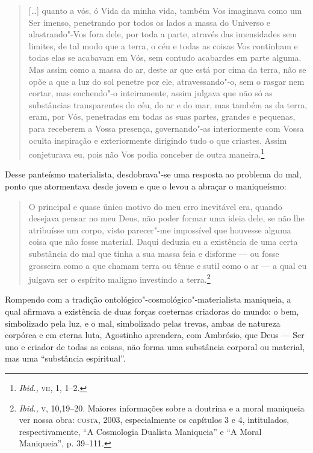 \begin{quote}
[\ldots{}] quanto a vós, ó Vida da minha vida, também Vos imaginava
como um Ser imenso, penetrando por todos os lados a massa do
Universo e alastrando"-Vos fora dele, por toda a parte, através
das imensidades sem limites, de tal modo que a terra, o céu e
todas as coisas Vos continham e todas elas se acabavam em Vós,
sem contudo acabardes em parte alguma. Mas assim como a massa do
ar, deste ar que está por cima da terra, não se opõe a que a luz
do sol penetre por ele, atravessando"-o, sem o rasgar nem cortar,
mas enchendo"-o inteiramente, assim julgava que não só as
substâncias transparentes do céu, do ar e do mar, mas também as
da terra, eram, por Vós, penetradas em todas as suas partes,
grandes e pequenas, para receberem a Vossa presença,
governando"-as interiormente com Vossa oculta inspiração e
exteriormente dirigindo tudo o que criastes. Assim conjeturava
eu, pois não Vos podia conceber de outra maneira.\footnote{
\emph{Ibid.,} \textsc{vii}, 1, 1--2.} 
\end{quote}

Desse panteísmo materialista, desdobrava"-se uma resposta ao
problema do mal, ponto que atormentava desde jovem e que o levou
a abraçar o maniqueísmo: 

\begin{quote}
O principal e quase único motivo do meu erro inevitável era,
quando desejava pensar no meu Deus, não poder formar uma ideia
dele, se não lhe atribuísse um corpo, visto parecer"-me
impossível que houvesse alguma coisa que não fosse material.
Daqui deduzia eu a existência de uma certa substância do mal que
tinha a sua massa feia e disforme --- ou fosse grosseira como a
que chamam terra ou tênue e sutil como o ar --- a qual eu julgava
ser o espírito maligno investindo a terra.\footnote{
\emph{Ibid.,} \textsc{v}, 10,19--20. Maiores informações sobre a
doutrina e a moral maniqueia ver nossa obra: \textsc{costa}, 2003,
especialmente os capítulos  3 e 4, intitulados, respectivamente,
“A Cosmologia Dualista Maniqueia” e “A Moral Maniqueia”, p.
39--111.}
\end{quote}

Rompendo com a tradição ontológico"-cosmológico"-materialista
maniqueia, a qual afirmava a existência de duas forças coeternas
criadoras do mundo: o bem, simbolizado pela luz,  e o mal,
simbolizado pelas trevas, ambas de natureza corpórea e em eterna
luta, Agostinho aprendera, com Ambrósio, que Deus --- Ser uno e
criador de todas as coisas, não forma uma substância corporal ou
material, mas uma “substância espiritual”. 

